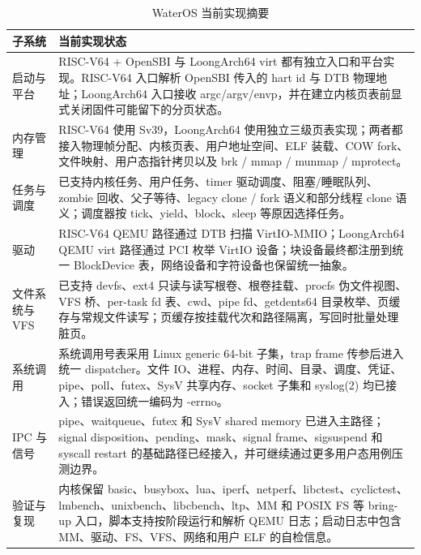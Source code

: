 \documentclass[12pt,openany,oneside,AutoFakeBold=true]{ctexbook}
\newcommand{\code}[1]{\textnormal{\rmfamily #1}}
\newcommand{\syscall}[1]{\textnormal{\rmfamily #1}}
\begin{document}
\begin{longtable}{>{\raggedright\arraybackslash}p{3.2cm}>{\raggedright\arraybackslash}p{10.3cm}}
  \caption{WaterOS 当前实现摘要}\label{tab:current-summary}\\
  \toprule[1.5pt]
  子系统 & 当前实现状态 \\
  \midrule[1pt]
  启动与平台 & RISC-V64 + OpenSBI 与 LoongArch64 virt 都有独立入口和平台实现。RISC-V64 入口解析 OpenSBI 传入的 hart id 与 DTB 物理地址；LoongArch64 入口接收 \code{argc/argv/envp}，并在建立内核页表前显式关闭固件可能留下的分页状态。 \\
  内存管理 & RISC-V64 使用 Sv39，LoongArch64 使用独立三级页表实现；两者都接入物理帧分配、内核页表、用户地址空间、ELF 装载、COW fork、文件映射、用户态指针拷贝以及 \syscall{brk} / \syscall{mmap} / \syscall{munmap} / \syscall{mprotect}。 \\
  任务与调度 & 已支持内核任务、用户任务、timer 驱动调度、阻塞/睡眠队列、zombie 回收、父子等待、legacy \syscall{clone} / \syscall{fork} 语义和部分线程 clone 语义；调度器按 tick、yield、block、sleep 等原因选择任务。 \\
  驱动 & RISC-V64 QEMU 路径通过 DTB 扫描 VirtIO-MMIO；LoongArch64 QEMU virt 路径通过 PCI 枚举 VirtIO 设备；块设备最终都注册到统一 \code{BlockDevice} 表，网络设备和字符设备也保留统一抽象。 \\
  文件系统与 VFS & 已支持 devfs、ext4 只读与读写根卷、根卷挂载、procfs 伪文件视图、VFS 桥、per-task fd 表、cwd、pipe fd、\syscall{getdents64} 目录枚举、页缓存与常规文件读写；页缓存按挂载代次和路径隔离，写回时批量处理脏页。 \\
  系统调用 & 系统调用号表采用 Linux generic 64-bit 子集，trap frame 传参后进入统一 dispatcher。文件 IO、进程、内存、时间、目录、调度、凭证、pipe、poll、futex、SysV 共享内存、socket 子集和 \syscall{syslog(2)} 均已接入；错误返回统一编码为 \code{-errno}。 \\
  IPC 与信号 & pipe、waitqueue、futex 和 SysV shared memory 已进入主路径；signal disposition、pending、mask、signal frame、sigsuspend 和 syscall restart 的基础路径已经接入，并可继续通过更多用户态用例压测边界。 \\
  验证与复现 & 内核保留 basic、busybox、lua、iperf、netperf、libctest、cyclictest、lmbench、unixbench、libcbench、ltp、MM 和 POSIX FS 等 bring-up 入口，脚本支持按阶段运行和解析 QEMU 日志；启动日志中包含 MM、驱动、FS、VFS、网络和用户 ELF 的自检信息。 \\
  \bottomrule[1.5pt]
\end{longtable}
\end{document}
